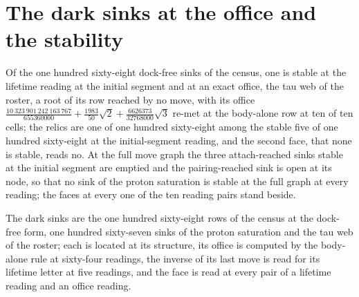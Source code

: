 \section{The dark sinks at the office and the stability}\label{mod:I-5-D540091-kskd-t1}
\begin{chtheorem}\label{box:I-5-D540091-kskd-t1:1}
Of the one hundred sixty-eight dock-free sinks of the census, one is stable at the lifetime reading at the initial segment and at an exact office, the tau web of the roster, a root of its row reached by no move, with its office $\tfrac{10\ 323\ 901\ 242\ 163\ 767}{655360000} + \tfrac{1983}{50}\sqrt{2} + \tfrac{6626373}{32768000}\sqrt{3}$ re-met at the body-alone row at ten of ten cells; the relics are one of one hundred sixty-eight among the stable five of one hundred sixty-eight at the initial-segment reading, and the second face, that none is stable, reads no. At the full move graph the three attach-reached sinks stable at the initial segment are emptied and the pairing-reached sink is open at its node, so that no sink of the proton saturation is stable at the full graph at every reading; the faces at every one of the ten reading pairs stand beside.
\end{chtheorem}
The dark sinks are the one hundred sixty-eight rows of the census at the dock-free form, one hundred sixty-seven sinks of the proton saturation and the tau web of the roster; each is located at its structure, its office is computed by the body-alone rule at sixty-four readings, the inverse of its last move is read for its lifetime letter at five readings, and the face is read at every pair of a lifetime reading and an office reading.

